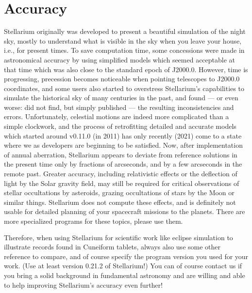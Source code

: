 

\chapter{Accuracy}
\label{ch:Accuracy}

Stellarium originally was developed to present a beautiful simulation
of the night sky, mostly to understand what is visible in the sky when
you leave your house, i.e., for present times. To save computation
time, some concessions were made in astronomical accuracy by using
simplified models which seemed acceptable at that time which was also
close to the standard epoch of J2000.0. However, time is progressing,
precession becomes noticeable when pointing telescopes to J2000.0 coordinates, and some 
users also started to overstress Stellarium's capabilities to simulate the
historical sky of many centuries in the past, and found --- or even
worse: did not find, but simply published --- the resulting
inconsistencies and errors.  Unfortunately, celestial motions are
indeed more complicated than a simple clockwork, and the process of
retrofitting detailed and accurate models which started around v0.11.0
(in 2011) has only recently (2021)  come to a
state where we as developers are beginning to be satisfied. Now, after
implementation of annual aberration, Stellarium appears to deviate
from reference solutions in the present time only by fractions of
arcseconds, and by a few arcseconds in the remote past.  Greater
accuracy, including relativistic effects or the deflection of light by
the Solar gravity field, may still be required for critical
observations of stellar occultations by asteroids, grazing
occultations of stars by the Moon or similar things. Stellarium does
not compute these effects, and is definitely not usable for detailed
planning of your spacecraft missions to the planets.
There are more specialized programs for these topics, please use them.

Therefore, when using Stellarium for scientific work like eclipse
simulation to illustrate records found in Cuneiform tablets, always
also use some other reference to compare, and of course specify the
program version you used for your work. (Use at least version 0.21.2
of Stellarium!)  You can of course contact us if you bring a solid background
in fundamental astronomy and are willing and able to help improving
Stellarium's accuracy even further!

